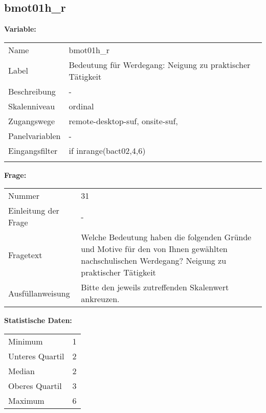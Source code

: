 	
	
	\subsection{bmot01h\_r}
	\label{subSection:bmot01h_r}

	\noindent\textbf{Variable:}\\
		\begin{tabular}{lL{11.3cm}}
			\label{tableVariable:bmot01h_r}
			Name & bmot01h\_r \\
			Label & Bedeutung für Werdegang: Neigung zu praktischer Tätigkeit \\
			Beschreibung & - \\
			Skalenniveau & ordinal \\
			Zugangswege &
				remote-desktop-suf,
				onsite-suf,
 \\
			Panelvariablen & -
			 \\
			Eingangsfilter & if inrange(bact02,4,6)  \\
 \\
		\end{tabular}

		\vspace*{1 cm}
		\noindent\textbf{Frage:}\\
		\begin{tabular}{lL{11.3cm}}
			\label{tableQuestion:bmot01h_r}
			Nummer & 31 \\
			Einleitung der Frage & - \\
			Fragetext & Welche Bedeutung haben die folgenden Gründe und Motive für den von Ihnen gewählten nachschulischen Werdegang?
Neigung zu praktischer Tätigkeit \\
			Ausfüllanweisung & Bitte den jeweils zutreffenden Skalenwert ankreuzen. \\
		\end{tabular}


		\vspace*{1 cm}
		\noindent\textbf{Statistische Daten:}\\
			\begin{tabular}{ll}
				\label{tableStatistics:bmot01h_r}
					Minimum & 1 \\
					Unteres Quartil & 2 \\
					Median & 2 \\
					Oberes Quartil & 3 \\
					Maximum & 6 \\
			\end{tabular}



